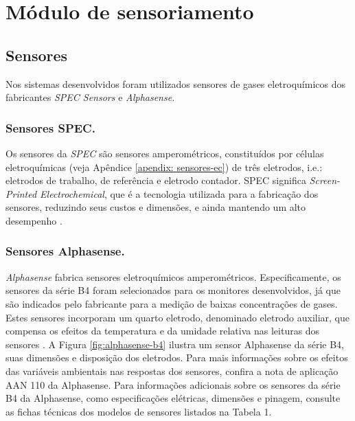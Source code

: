 \section{Módulo de sensoriamento}
\subsection{Sensores}

Nos sistemas desenvolvidos foram utilizados sensores de gases eletroquímicos dos fabricantes \textit{SPEC Sensors} e \textit{Alphasense}.

\subsubsection{Sensores SPEC.}

Os sensores da \textit{SPEC} são sensores amperométricos, constituídos por células eletroquímicas (veja Apêndice \ref{apendix: sensores-ec}) de três eletrodos, i.e.: eletrodos de trabalho, de referência e eletrodo contador. SPEC significa \textit{Screen-Printed Electrochemical}, que é a tecnologia utilizada para a fabricação dos sensores, reduzindo seus custos e dimensões, e ainda mantendo um alto desempenho \cite{SPECSensors2016SPECConsiderations}.

\subsubsection{Sensores Alphasense.}

\textit{Alphasense} fabrica sensores eletroquímicos amperométricos. Especificamente, os sensores da série B4 foram selecionados para os monitores desenvolvidos, já que são indicados pelo fabricante para a medição de baixas concentrações de gases. Estes sensores incorporam um quarto eletrodo, denominado eletrodo auxiliar, que compensa os efeitos da temperatura e da umidade relativa nas leituras dos sensores \cite{Baron2017AmperometricReview}. A Figura \ref{fig:alphasense-b4} ilustra um sensor Alphasense da série B4, suas dimensões e disposição dos eletrodos. Para mais informações sobre os efeitos das variáveis ambientais nas respostas dos sensores, confira a nota de aplicação AAN 110 da Alphasense. Para informações adicionais sobre os sensores da série B4 da Alphasense, como especificações elétricas, dimensões e pinagem, consulte as fichas técnicas dos modelos de sensores listados na Tabela 1.

